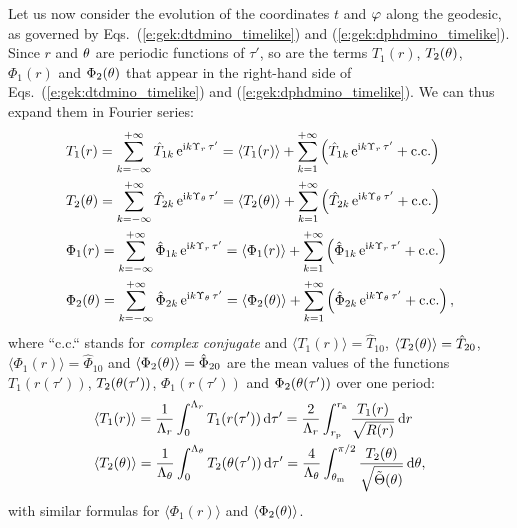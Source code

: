 Let us now consider the evolution of the coordinates $t$ and $\varphi$ along the
geodesic, as governed
by Eqs.~(\ref{e:gek:dtdmino_timelike}) and (\ref{e:gek:dphdmino_timelike}).
Since $r$ and $\theta$ are periodic functions of $\tau'$, so are the terms
$T_1(r)$, $T_2(\theta)$, $\Phi_1(r)$ and $\Phi_2(\theta)$ that appear in the right-hand side
of Eqs.~(\ref{e:gek:dtdmino_timelike}) and (\ref{e:gek:dphdmino_timelike}). We can thus expand them in Fourier series:
\begin{subequations}
\begin{align}
  &  T_1(r) = \sum_{k=-\infty}^{+\infty} \hat{T}_{1k} \, \mathrm{e}^{\mathrm{i} k \Upsilon_r \, \tau'} = \langle T_1(r) \rangle + \sum_{k=1}^{+\infty} \left( \hat{T}_{1k} \, \mathrm{e}^{\mathrm{i} k \Upsilon_r \, \tau'} + \mathrm{c.c.} \right) \\
  &  T_2(\theta) = \sum_{k=-\infty}^{+\infty} \hat{T}_{2k} \, \mathrm{e}^{\mathrm{i} k \Upsilon_\theta \, \tau'} = \langle T_2(\theta) \rangle + \sum_{k=1}^{+\infty} \left( \hat{T}_{2k} \, \mathrm{e}^{\mathrm{i} k \Upsilon_\theta \, \tau'} + \mathrm{c.c.} \right) \\
  &  \Phi_1(r) = \sum_{k=-\infty}^{+\infty} \hat{\Phi}_{1k} \, \mathrm{e}^{\mathrm{i} k \Upsilon_r \, \tau'} = \langle \Phi_1(r) \rangle + \sum_{k=1}^{+\infty} \left( \hat{\Phi}_{1k} \, \mathrm{e}^{\mathrm{i} k \Upsilon_r \, \tau'} + \mathrm{c.c.} \right) \\
  &  \Phi_2(\theta) = \sum_{k=-\infty}^{+\infty} \hat{\Phi}_{2k} \, \mathrm{e}^{\mathrm{i} k \Upsilon_\theta \, \tau'} = \langle \Phi_2(\theta) \rangle + \sum_{k=1}^{+\infty} \left( \hat{\Phi}_{2k} \, \mathrm{e}^{\mathrm{i} k \Upsilon_\theta \, \tau'} + \mathrm{c.c.} \right) ,
\end{align}
\end{subequations}
where ``c.c.`` stands for \emph{complex conjugate} and $\langle T_1(r) \rangle = \hat{T}_{10}$, $\langle T_2(\theta) \rangle = \hat{T}_{20}$,
$\langle \Phi_1(r) \rangle = \hat{\Phi}_{10}$ and $\langle \Phi_2(\theta) \rangle = \hat{\Phi}_{20}$
are the mean values of the functions $T_1(r(\tau'))$,
$T_2(\theta(\tau'))$, $\Phi_1(r(\tau'))$ and $\Phi_2(\theta(\tau'))$ over one period:
\begin{subequations}
\begin{align}
    & \langle T_1(r) \rangle = \frac{1}{\Lambda_r} \int_{0}^{\Lambda_r}
        T_1(r(\tau'))\, \mathrm{d} \tau'
        = \frac{2}{\Lambda_r} \int_{r_{\rm p}}^{r_{\rm a}} \frac{T_1(r)}{\sqrt{R(r)}}\, \mathrm{d} r \\
    & \langle T_2(\theta) \rangle = \frac{1}{\Lambda_\theta} \int_{0}^{\Lambda_\theta}
        T_2(\theta(\tau'))\, \mathrm{d} \tau'
        = \frac{4}{\Lambda_\theta} \int_{\theta_{\rm m}}^{\pi/2}
            \frac{T_2(\theta)}{\sqrt{\tilde\Theta(\theta)}}\, \mathrm{d} \theta ,
\end{align}
\end{subequations}
with similar formulas for $\langle \Phi_1(r) \rangle$ and $\langle \Phi_2(\theta) \rangle$.


